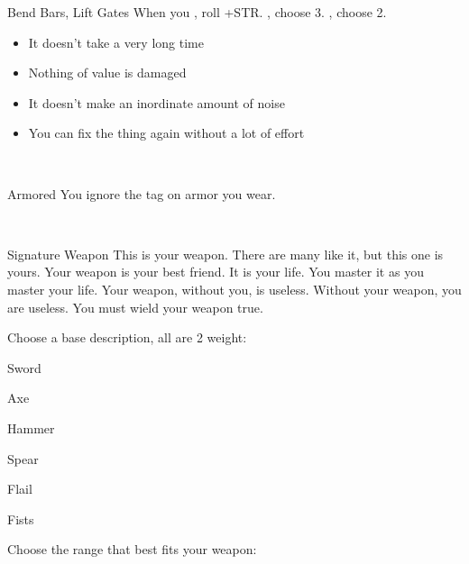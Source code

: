 \documentclass[8pt]{extarticle}
\begin{document}
\begin{minipage}[t]{4.6in}


\begin{basicmove}{Bend Bars, Lift Gates}
  When you ,
  roll +STR. \onSuccess, choose 3. \onPartial, choose 2.

  \begin{itemize}
  \item It doesn’t take a very long time
  \item Nothing of value is damaged
  \item It doesn’t make an inordinate amount of noise
  \item You can fix the thing again without a lot of effort
  \end{itemize}
\end{basicmove}
\

\begin{basicmove}{Armored}
  You ignore the  tag on armor you wear.
\end{basicmove}
\


\begin{basicmove}{Signature Weapon}
  This is your weapon. There are many like it, but this one is
  yours. Your weapon is your best friend. It is your life. You master
  it as you master your life. Your weapon, without you, is
  useless. Without your weapon, you are useless. You must wield your
  weapon true.

  Choose a base description, all are 2 weight:

  \begin{choices}
  \item Sword
  \item Axe
  \item Hammer
  \item Spear
  \item Flail
  \item Fists
  \end{choices}

  Choose the range that best fits your weapon:

  \begin{choices}
  \item {}
  \item {}
  \item {}
  \end{choices}


\end{basicmove}
\end{minipage}
\end{document}
